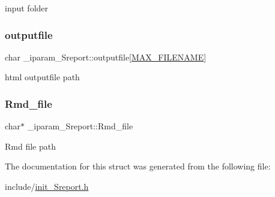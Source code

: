 input folder \mbox{\label{struct__iparam__Sreport_aab71d9b5647daf65a8ba9ba6f7a35ee5}} 
\subsubsection{\texorpdfstring{outputfile}{outputfile}}
{\footnotesize\ttfamily char \+\_\+iparam\+\_\+\+Sreport\+::outputfile\mbox{[}\mbox{\hyperlink{defines_8h_abe0ec333b60117063f9b9fd9f849cb08}{M\+A\+X\+\_\+\+F\+I\+L\+E\+N\+A\+ME}}\mbox{]}}

html outputfile path \mbox{\label{struct__iparam__Sreport_a8a234e0192ac0cb671c75ea16a545fa1}} 
\subsubsection{\texorpdfstring{Rmd\+\_\+file}{Rmd\_file}}
{\footnotesize\ttfamily char$\ast$ \+\_\+iparam\+\_\+\+Sreport\+::\+Rmd\+\_\+file}

Rmd file path 

The documentation for this struct was generated from the following file\+:\begin{DoxyCompactItemize}
\item 
include/\mbox{\hyperlink{init__Sreport_8h}{init\+\_\+\+Sreport.\+h}}\end{DoxyCompactItemize}
